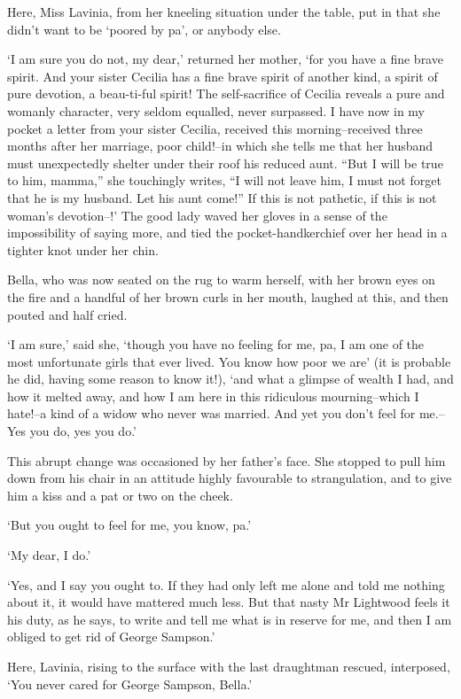 Here, Miss Lavinia, from her kneeling situation under the table, put in
that she didn’t want to be ‘poored by pa’, or anybody else.

‘I am sure you do not, my dear,’ returned her mother, ‘for you have a
fine brave spirit. And your sister Cecilia has a fine brave spirit
of another kind, a spirit of pure devotion, a beau-ti-ful spirit! The
self-sacrifice of Cecilia reveals a pure and womanly character, very
seldom equalled, never surpassed. I have now in my pocket a letter from
your sister Cecilia, received this morning--received three months after
her marriage, poor child!--in which she tells me that her husband must
unexpectedly shelter under their roof his reduced aunt. “But I will be
true to him, mamma,” she touchingly writes, “I will not leave him, I
must not forget that he is my husband. Let his aunt come!” If this is
not pathetic, if this is not woman’s devotion--!’ The good lady waved
her gloves in a sense of the impossibility of saying more, and tied the
pocket-handkerchief over her head in a tighter knot under her chin.

Bella, who was now seated on the rug to warm herself, with her brown
eyes on the fire and a handful of her brown curls in her mouth, laughed
at this, and then pouted and half cried.

‘I am sure,’ said she, ‘though you have no feeling for me, pa, I am one
of the most unfortunate girls that ever lived. You know how poor we are’
(it is probable he did, having some reason to know it!), ‘and what a
glimpse of wealth I had, and how it melted away, and how I am here in
this ridiculous mourning--which I hate!--a kind of a widow who never was
married. And yet you don’t feel for me.--Yes you do, yes you do.’

This abrupt change was occasioned by her father’s face. She stopped
to pull him down from his chair in an attitude highly favourable to
strangulation, and to give him a kiss and a pat or two on the cheek.

‘But you ought to feel for me, you know, pa.’

‘My dear, I do.’

‘Yes, and I say you ought to. If they had only left me alone and told
me nothing about it, it would have mattered much less. But that nasty Mr
Lightwood feels it his duty, as he says, to write and tell me what is in
reserve for me, and then I am obliged to get rid of George Sampson.’

Here, Lavinia, rising to the surface with the last draughtman rescued,
interposed, ‘You never cared for George Sampson, Bella.’

